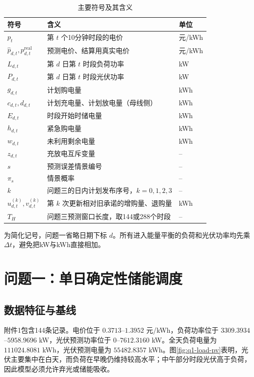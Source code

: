 \documentclass[UTF8,12pt,a4paper]{ctexart}
\begin{document}
\begin{table}[H]
\centering
\caption{主要符号及其含义}
\label{tab:symbols}
\begin{tabular}{>{\centering\arraybackslash}p{2.2cm}p{8.8cm}p{2.2cm}}
\toprule
符号 & 含义 & 单位\\
\midrule
$p_t$ & 第 $t$ 个10分钟时段的电价 & 元/kWh\\
$\widehat p_{d,t},p^{\mathrm{real}}_{d,t}$ & 预测电价、结算用真实电价 & 元/kWh\\
$L_{d,t}$ & 第 $d$ 日第 $t$ 时段负荷功率 & kW\\
$P_{d,t}$ & 第 $d$ 日第 $t$ 时段光伏功率 & kW\\
$g_{d,t}$ & 计划购电量 & kWh\\
$c_{d,t},d_{d,t}$ & 计划充电量、计划放电量（母线侧） & kWh\\
$E_{d,t}$ & 时段开始时储电量 & kWh\\
$h_{d,t}$ & 紧急购电量 & kWh\\
$w_{d,t}$ & 未利用剩余电量 & kWh\\
$z_{d,t}$ & 充放电互斥变量 & --\\
$s$ & 预测误差情景编号 & --\\
$\pi_s$ & 情景概率 & --\\
$k$ & 问题三的日内计划发布序号，$k=0,1,2,3$ & --\\
$u_{d,t}^{(k)},v_{d,t}^{(k)}$ & 第 $k$ 次更新相对旧承诺的增购量、退购量 & kWh\\
$T_H$ & 问题三预测窗口长度，取144或288个时段 & --\\
\bottomrule
\end{tabular}
\end{table}

为简化记号，问题一省略日期下标 $d$。所有进入能量平衡的负荷和光伏功率均先乘 $\Delta t$，避免把kW与kWh直接相加。

\section{问题一：单日确定性储能调度}

\subsection{数据特征与基线}

附件1包含144条记录。电价位于 $0.3713$--$1.3952$ 元/kWh，负荷功率位于 $3309.3934$--$5958.9696$ kW，光伏预测功率位于 $0$--$7612.3160$ kW。全天负荷电量为 $111024.8081$ kWh，光伏预测电量为 $55482.8357$ kWh。图\ref{fig:q1-load-pv}表明，光伏主要集中在白天，而负荷在早晚仍维持较高水平；中午部分时段光伏高于负荷，因此模型必须允许弃光或储能吸收。
\end{document}
